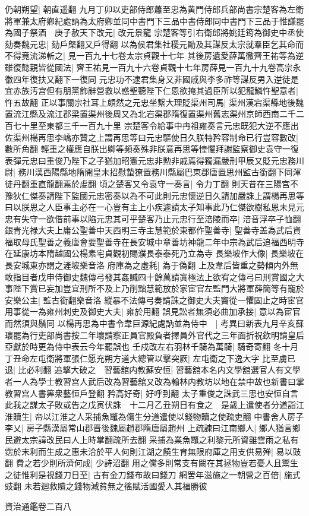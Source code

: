 仍朝朔望|{
	朝直遥翻}
九月丁卯以吏部侍郎蕭至忠為黄門侍郎兵部尚書宗楚客為左衛將軍兼太府卿紀處訥為太府卿並同中書門下三品中書侍郎同中書門下三品于惟謙罷為國子祭酒　庚子赦天下改元|{
	改元景龍}
宗楚客等引右衛郎將姚廷筠為御史中丞使劾奏魏元忠|{
	劾戶槩翻又戶得翻}
以為侯君集社稷元勛及其謀反太宗就羣臣乞其命而不得竟流涕斬之|{
	見一百九十七卷太宗貞觀十七年}
其後房遺愛薛萬徹齊王祐等為逆雖復懿親皆從國法|{
	齊王祐見一百九十六卷貞觀十七年房薛見一百九十九卷高宗永徽四年復扶又翻下一復同}
元忠功不逮君集身又非國戚與李多祚等謀反男入逆徒是宜赤族汚宫但有朋黨飾辭營救以惑聖聽陛下仁恩欲掩其過臣所以犯龍鱗忤聖意者|{
	忤五故翻}
正以事關宗社耳上頗然之元忠坐繫大理貶渠州司馬|{
	渠州漢宕渠縣地後魏置流江縣及流江郡梁置渠州後周又為北宕渠郡隋復置渠州舊志渠州京師西南二千二百七十里至東都三千一百九十里}
宗楚客令給事中冉祖雍奏言元忠既犯大逆不應出佐渠州楊再思李嶠亦贊之上謂再思等曰元忠驅使日久朕特矜容制命已行豈容數改|{
	數所角翻}
輕重之權應自朕出卿等頻奏殊非朕意再思等惶懼拜謝監察御史袁守一復表彈元忠曰重俊乃陛下之子猶加昭憲元忠非勲非戚焉得獨漏嚴刑甲辰又貶元忠務川尉|{
	務川漢西陽縣地隋開皇末招慰蟄獠置務川縣屬巴東郡唐置思州監古銜翻下同渾徒丹翻重直龍翻焉於䖍翻}
頃之楚客又令袁守一奏言|{
	令力丁翻}
則天昔在三陽宫不豫狄仁傑奏請陛下監國元忠密奏以為不可此則元忠懷逆日久請加嚴誅上謂楊再思等曰以朕思之人臣事主必在一心豈有主上小疾遽請太子知事此乃仁傑欲樹私恩未見元忠有失守一欲借前事以陷元忠其可乎楚客乃止元忠行至涪陵而卒|{
	涪音浮卒子恤翻}
銀青光禄大夫上庸公聖善中天西明三寺主慧範於東都作聖善寺|{
	聖善寺盖為武后資福取母氏聖善之義唐會要聖善寺在長安城中章善坊神龍二年中宗為武后追福西明寺在延康坊本隋越國公楊素宅貞觀初賜濮長泰泰死乃立為寺}
長樂坡作大像|{
	長樂坡在長安城東亦謂之滻坡樂音洛}
府庫為之虛耗|{
	為于偽翻}
上及韋后皆重之勢傾内外無敢指目者戊申侍御史魏傳弓發其姦贓四十餘萬請寘極法上欲宥之傳弓曰刑賞國之大事陛下賞已妄加豈宜刑所不及上乃削黜慧範放於家宦官左監門大將軍薛簡等有寵於安樂公主|{
	監古銜翻樂音洛}
縱暴不法傳弓奏請誅之御史大夫竇從一懼固止之時宦官用事從一為雍州刺史及御史大夫|{
	雍於用翻}
誤見訟者無須必曲加承接|{
	意以為宦官而然須與鬚同}
以楊再思為中書令韋巨源紀處訥並為侍中　|{
	考異曰新表九月辛亥蘇瓌罷為行吏部尚書按二年壞請察正員官殿負者擇員外官代之三年面折祝欽明請皇后亞獻於時更為侍中表云今年罷誤也}
壬戍改左右羽林千騎為萬騎|{
	騎奇寄翻}
冬十月丁丑命左屯衛將軍張仁愿充朔方道大總管以擊突厥|{
	左屯衛之下逸大字}
比至虜已退|{
	比必利翻}
追擊大破之　習藝舘内教蘇安恒|{
	習藝舘本名内文學舘選官人有文學者一人為學士教習宫人武后改為習藝舘又改為翰林内教坊以地在禁中故也新書曰掌教習宫人書筭衆藝恒戶登翻}
矜高好奇|{
	好呼到翻}
太子重俊之誅武三思也安恒自言此我之謀太子敗或告之戊寅伏誅　十二月乙丑朔日有食之　是歲上遣使者分道詣江淮贖生|{
	帝以江淮之人采捕魚鼈為傷生分道遣使以錢物贖之使疏吏翻}
中書舍人房子李乂|{
	房子縣漢屬常山郡晋後魏屬趙郡隋唐屬趙州}
上疏諫曰江南鄉人|{
	鄉人猶言鄉民避太宗諱改民曰人上時掌翻疏所去翻}
采捕為業魚鼈之利黎元所資雖雲雨之私有霑於末利而生成之惠未洽於平人何則江湖之饒生育無限府庫之用支供易殚|{
	易以豉翻}
費之若少則所濟何成|{
	少詩沼翻}
用之儻多則常支有闕在其拯物豈若憂人且鬻生之徒惟利是視錢刀日至|{
	古有金刀錢布故曰錢刀}
網罟年滋施之一朝營之百倍|{
	施式豉翻}
未若迴救贖之錢物減貧無之徭賦活國愛人其福勝彼

資治通鑑卷二百八
